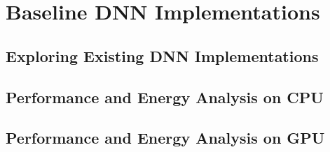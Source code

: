 
\section{Baseline DNN Implementations}
\label{sec-baseline}

\subsection{Exploring Existing DNN Implementations}

\subsection{Performance and Energy Analysis on CPU}

\subsection{Performance and Energy Analysis on GPU}
